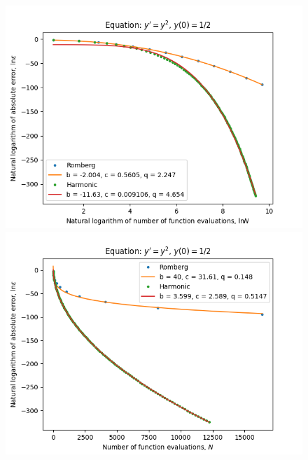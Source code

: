\begin{figure}[H]
\centering
\begin{minipage}{0.45\textwidth}
\centering
\includegraphics[scale=0.45]{emr_plots/singularity_0_hp_log_log_pow_fit_trend.png}
\end{minipage}
\begin{minipage}{0.45\textwidth}
\centering
\includegraphics[scale=0.45]{emr_plots/singularity_0_hp_trend.png}
\end{minipage}
\end{figure}


